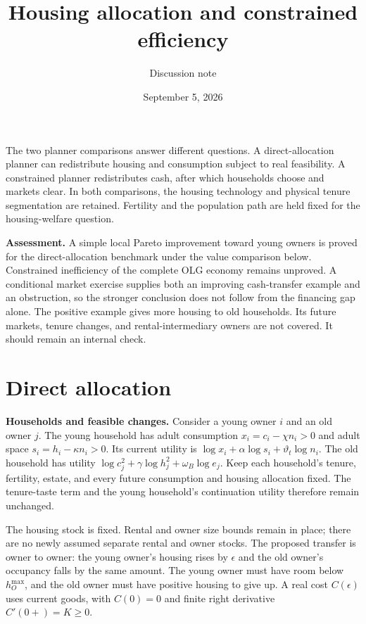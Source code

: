 \documentclass[11pt]{article}
\title{Housing allocation and constrained efficiency}
\author{Discussion note}
\date{September 5, 2026}
\begin{document}
\maketitle
\vspace{-1em}
The two planner comparisons answer different questions. A direct-allocation
planner can redistribute housing and consumption subject to real feasibility.
A constrained planner redistributes cash, after which households choose and
markets clear. In both comparisons, the housing technology and physical tenure
segmentation are retained. Fertility and the population path are held fixed
for the housing-welfare question.

\textbf{Assessment.} A simple local Pareto improvement toward young owners is
proved for the direct-allocation benchmark under the value comparison below.
Constrained inefficiency of the complete OLG economy remains unproved. A
conditional market exercise supplies both an improving cash-transfer example
and an obstruction, so the stronger conclusion does not follow from the
financing gap alone. The positive example gives more housing to old households.
Its future markets, tenure changes, and rental-intermediary owners are not
covered. It should remain an internal check.

\section{Direct allocation}

\textbf{Households and feasible changes.} Consider a young owner $i$ and an old
owner $j$. The young household has adult consumption $x_i=c_i-\chi n_i>0$ and
adult space $s_i=h_i-\kappa n_i>0$. Its current utility is
$\log x_i+\alpha\log s_i+\vartheta_t\log n_i$. The old household has utility
$\log c_j^2+\gamma\log h_j^2+\omega_B\log e_j$. Keep each household's tenure,
fertility, estate, and every future consumption and housing allocation fixed.
The tenure-taste term and the young household's continuation utility therefore
remain unchanged.

The housing stock is fixed. Rental and owner size bounds remain in place;
there are no newly assumed separate rental and owner stocks. The proposed
transfer is owner to owner: the young owner's housing rises by $\epsilon$ and
the old owner's occupancy falls by the same amount. The young owner must have
room below $h_O^{\max}$, and the old owner must have positive housing to give up.
A real cost $C(\epsilon)$ uses current goods, with $C(0)=0$ and finite right
derivative $C'(0+)=K\geq0$.
\end{document}
